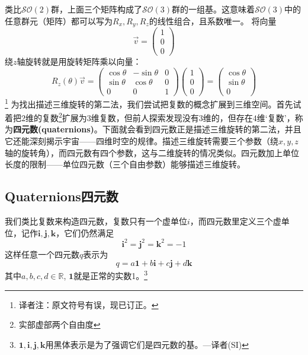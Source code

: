 类比$\mathcal{SO}(2)$群，上面三个矩阵构成了$\mathcal{SO}(3)$群的一组基。这意味着$\mathcal{SO}(3)$中的任意群元（矩阵）都可以写为$R_x, R_y, R_z$的线性组合，且系数唯一。
将向量
\begin{equation*}
\vec{v} = \begin{pmatrix}
			1 \\ 0 \\ 0
		\end{pmatrix}
\end{equation*}
绕$z$轴旋转就是用旋转矩阵乘以向量：
\begin{equation}
\label{equ3.24}
R_z(\theta) \vec{v} =
	\begin{pmatrix}
		\cos \theta & -\sin \theta & 0 \\
		\sin \theta & \cos \theta & 0 \\
		0 & 0 & 1
	\end{pmatrix}
	\begin{pmatrix}
		1 \\ 0 \\ 0
	\end{pmatrix}
=
	\begin{pmatrix}
		\cos \theta \\ \sin \theta \\ 0
	\end{pmatrix}
\end{equation} \footnote{译者注：原文符号有误，现已订正。}
为找出描述三维旋转的第二法，我们尝试把复数的概念扩展到三维空间。首先试着把$2$维的复数\footnote{实部虚部两个自由度}扩展为$3$维复数，但前人探索发现没有$3$维的，但存在$4$维‘复数’，称为{\bfseries 四元数(quaternions)}。下面就会看到四元数正是描述三维旋转的第二法，并且它还能深刻揭示宇宙——四维时空的规律。描述三维旋转需要三个参数（绕$x,y,z$轴的旋转角），而四元数有四个参数，这与二维旋转的情况类似。四元数加上单位长度的限制——单位四元数（三个自由参数）能够描述三维旋转。

\subsection[四元数]{Quaternions\quad 四元数}
\label{sec3.3.1}
我们类比复数来构造四元数，复数只有一个虚单位$i$，而四元数里定义三个虚单位，记作$\mathbf{i,j,k}$，它们仍然满足
\begin{equation}
\label{equ3.25}
\mathbf{i}^2 = \mathbf{j}^2 = \mathbf{k}^2 = -1
\end{equation}
这样任意一个四元数$q$表示为
\begin{equation}
\label{equ3.26}
q = a\mathbf{1} + b\mathbf{i} + c\mathbf{j} + d\mathbf{k}
\end{equation}
其中$a, b, c, d \in \mathbb{R}$, $\mathbf{1}$就是正常的实数1。\footnote{$\mathbf{1,i,j,k}$用黑体表示是为了强调它们是四元数的基。---译者(SI)}

